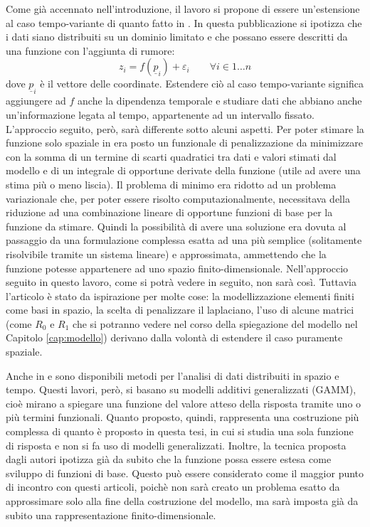 \documentclass[a4paper,11pt,twoside,openright]{book}							%
\begin{document}
Come già accennato nell'introduzione, il lavoro si propone di essere un'estensione al caso tempo-variante di quanto fatto in \cite{art:sangalli}. In questa pubblicazione si ipotizza che i dati siano distribuiti su un dominio limitato e che possano essere descritti da una funzione con l'aggiunta di rumore:
$$
z_i=f(\underline{p}_i) + \varepsilon_i \qquad \forall i \in 1\ldots n
$$
dove $\underline{p}_i$ è il vettore delle coordinate. Estendere ciò al caso tempo-variante significa aggiungere ad $f$ anche la dipendenza temporale e studiare dati che abbiano anche un'informazione legata al tempo, appartenente ad un intervallo fissato. L'approccio seguito, però, sarà differente sotto alcuni aspetti. Per poter stimare la funzione solo spaziale in \cite{art:sangalli} era posto un funzionale di penalizzazione da minimizzare con la somma di un termine di scarti quadratici tra dati e valori stimati dal modello e di un integrale di opportune derivate della funzione (utile ad avere una stima più o meno liscia). Il problema di minimo era ridotto ad un problema variazionale che, per poter essere risolto computazionalmente, necessitava della riduzione ad una combinazione lineare di opportune funzioni di base per la funzione da stimare. Quindi la possibilità di avere una soluzione era dovuta al passaggio da una formulazione complessa esatta ad una più semplice (solitamente risolvibile tramite un sistema lineare) e approssimata, ammettendo che la funzione potesse appartenere ad uno spazio finito-dimensionale. Nell'approccio seguito in questo lavoro, come si potrà vedere in seguito, non sarà così. Tuttavia l'articolo è stato da ispirazione per molte cose: la modellizzazione elementi finiti come basi in spazio, la scelta di penalizzare il laplaciano, l'uso di alcune matrici (come $R_0$ e $R_1$ che si potranno vedere nel corso della spiegazione del modello nel Capitolo \ref{cap:modello}) derivano dalla volontà di estendere il caso puramente spaziale.

Anche in \cite{art:augustin} e \cite{art:marra} sono disponibili metodi per l'analisi di dati distribuiti in spazio e tempo. Questi lavori, però, si basano su modelli additivi generalizzati (GAMM), cioè mirano a spiegare una funzione del valore atteso della risposta tramite uno o più termini funzionali. Quanto proposto, quindi, rappresenta una costruzione più complessa di quanto è proposto in questa tesi, in cui si studia una sola funzione di risposta e non si fa uso di modelli generalizzati. Inoltre, la tecnica proposta dagli autori ipotizza già da subito che la funzione possa essere estesa come sviluppo di funzioni di base. Questo può essere considerato come il maggior punto di incontro con questi articoli, poichè non sarà creato un problema esatto da approssimare solo alla fine della costruzione del modello, ma sarà imposta già da subito una rappresentazione finito-dimensionale.
\end{document}
